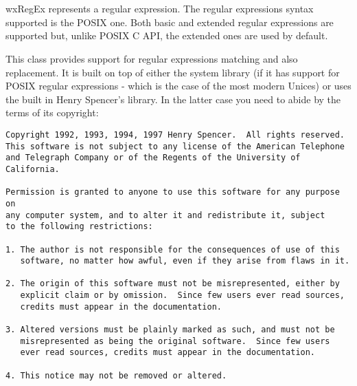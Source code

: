 
\section{}\label{wxregex}

wxRegEx represents a regular expression. The regular expressions syntax
supported is the POSIX one. Both basic and extended regular expressions are
supported but, unlike POSIX C API, the extended ones are used by default.

This class provides support for regular expressions matching and also
replacement. It is built on top of either the system library (if it has support
for POSIX regular expressions - which is the case of the most modern Unices) or
uses the built in Henry Spencer's library. In the latter case you need to abide
by the terms of its copyright:

\begin{verbatim}
Copyright 1992, 1993, 1994, 1997 Henry Spencer.  All rights reserved.
This software is not subject to any license of the American Telephone
and Telegraph Company or of the Regents of the University of California.

Permission is granted to anyone to use this software for any purpose on
any computer system, and to alter it and redistribute it, subject
to the following restrictions:

1. The author is not responsible for the consequences of use of this
   software, no matter how awful, even if they arise from flaws in it.

2. The origin of this software must not be misrepresented, either by
   explicit claim or by omission.  Since few users ever read sources,
   credits must appear in the documentation.

3. Altered versions must be plainly marked as such, and must not be
   misrepresented as being the original software.  Since few users
   ever read sources, credits must appear in the documentation.

4. This notice may not be removed or altered.
\end{verbatim}


